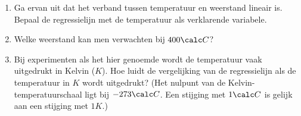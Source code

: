 \begin{enumerate}[label=(\alph*)]
    \item Ga ervan uit dat het verband tussen temperatuur en weerstand lineair is.
    Bepaal de regressielijn met de temperatuur als verklarende variabele.
    \answer{

    }

    \item Welke weerstand kan men verwachten bij $400\calc C$?
    \answer{

    }

    \item Bij experimenten als het hier genoemde wordt de temperatuur vaak uitgedrukt in Kelvin ($K$).
    Hoe luidt de vergelijking van de regressielijn als de temperatuur in $K$ wordt uitgedrukt?
    (Het nulpunt van de Kelvin-temperatuurschaal ligt bij $-273\calc C$.
    Een stijging met $1\calc C$ is gelijk aan een stijging met $1 K$.)
    \answer{
    
    }
\end{enumerate}